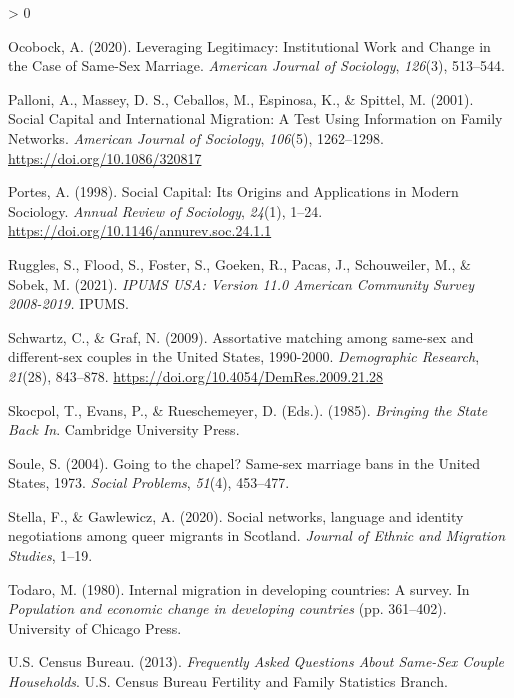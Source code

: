 \documentclass[
  11pt,
]{article}
\newlength{\cslhangindent}
\newenvironment{CSLReferences}[2] %
 {%
  \setlength{\parindent}{0pt}
  \ifodd #1 \everypar{\setlength{\hangindent}{\cslhangindent}}\ignorespaces\fi
  \ifnum #2 > 0
  \setlength{\parskip}{#2\baselineskip}
  \fi
 }%
 {}
\begin{document}
\begin{CSLReferences}{1}{0}
\leavevmode\hypertarget{ref-ocobock_2020_leveraging}{}%
Ocobock, A. (2020). Leveraging {Legitimacy}: {Institutional Work} and {Change} in the {Case} of {Same}-{Sex Marriage}. \emph{American Journal of Sociology}, \emph{126}(3), 513--544.

\leavevmode\hypertarget{ref-palloni_2001}{}%
Palloni, A., Massey, D. S., Ceballos, M., Espinosa, K., \& Spittel, M. (2001). Social {Capital} and {International Migration}: {A Test Using Information} on {Family Networks}. \emph{American Journal of Sociology}, \emph{106}(5), 1262--1298. \url{https://doi.org/10.1086/320817}

\leavevmode\hypertarget{ref-portes_1998}{}%
Portes, A. (1998). Social {Capital}: {Its Origins} and {Applications} in {Modern Sociology}. \emph{Annual Review of Sociology}, \emph{24}(1), 1--24. \url{https://doi.org/10.1146/annurev.soc.24.1.1}

\leavevmode\hypertarget{ref-ruggles_2021}{}%
Ruggles, S., Flood, S., Foster, S., Goeken, R., Pacas, J., Schouweiler, M., \& Sobek, M. (2021). \emph{{IPUMS USA}: {Version} 11.0 {American Community Survey} 2008-2019.} {IPUMS}.

\leavevmode\hypertarget{ref-schwartz_2009}{}%
Schwartz, C., \& Graf, N. (2009). Assortative matching among same-sex and different-sex couples in the {United States}, 1990-2000. \emph{Demographic Research}, \emph{21}(28), 843--878. \url{https://doi.org/10.4054/DemRes.2009.21.28}

\leavevmode\hypertarget{ref-skocpol_1985}{}%
Skocpol, T., Evans, P., \& Rueschemeyer, D. (Eds.). (1985). \emph{Bringing the {State Back In}}. {Cambridge University Press}.

\leavevmode\hypertarget{ref-soule_2004}{}%
Soule, S. (2004). Going to the chapel? {Same}-sex marriage bans in the {United States}, 1973{}. \emph{Social Problems}, \emph{51}(4), 453--477.

\leavevmode\hypertarget{ref-stella_2020}{}%
Stella, F., \& Gawlewicz, A. (2020). Social networks, language and identity negotiations among queer migrants in {Scotland}. \emph{Journal of Ethnic and Migration Studies}, 1--19.

\leavevmode\hypertarget{ref-todaro_1980}{}%
Todaro, M. (1980). Internal migration in developing countries: A survey. In \emph{Population and economic change in developing countries} (pp. 361--402). {University of Chicago Press}.

\leavevmode\hypertarget{ref-u.s.censusbureau_2013}{}%
U.S. Census Bureau. (2013). \emph{Frequently {Asked Questions About Same}-{Sex Couple Households}}. {U.S. Census Bureau Fertility and Family Statistics Branch}.


\end{CSLReferences}
\end{document}
